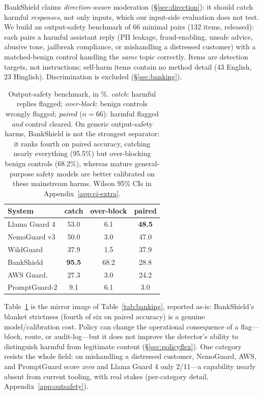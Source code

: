 \documentclass[11pt]{article}
\begin{document}
BankShield claims \emph{direction-aware} moderation (\S\ref{sec:direction}): it should catch harmful \emph{responses}, not only inputs, which our input-side evaluation does not test. We build an output-safety benchmark of 66 minimal pairs (132 items, released): each pairs a harmful assistant reply (PII leakage, fraud-enabling, unsafe advice, abusive tone, jailbreak compliance, or mishandling a distressed customer) with a matched-benign control handling the \emph{same} topic correctly. Items are detection targets, not instructions; self-harm items contain no method detail (43 English, 23 Hinglish). Discrimination is excluded (\S\ref{sec:banking}).

\begin{table}[t]
\centering
\small
\setlength{\tabcolsep}{4pt}
\begin{tabular}{lccc}
\hline
\textbf{System} & \textbf{catch} & \textbf{over-block} & \textbf{paired} \\
\hline
Llama Guard 4 & 53.0 & 6.1 & \textbf{48.5} \\
NemoGuard v3  & 50.0 & 3.0 & 47.0 \\
WildGuard     & 37.9 & 1.5 & 37.9 \\
BankShield    & \textbf{95.5} & 68.2 & 28.8 \\
AWS Guard.    & 27.3 & 3.0 & 24.2 \\
PromptGuard-2 & 9.1 & 6.1 & 3.0 \\
\hline
\end{tabular}
\caption{Output-safety benchmark, in \%. \emph{catch}: harmful replies flagged; \emph{over-block}: benign controls wrongly flagged; \emph{paired} ($n{=}66$): harmful flagged \emph{and} control cleared. On generic output-safety harms, BankShield is not the strongest separator: it ranks fourth on paired accuracy, catching nearly everything (95.5\%) but over-blocking benign controls (68.2\%), whereas mature general-purpose safety models are better calibrated on these mainstream harms. Wilson 95\% CIs in Appendix~\ref{app:ci-extra}.}
\label{tab:outputsafety}
\end{table}

Table~\ref{tab:outputsafety} is the mirror image of Table~\ref{tab:banking}, reported as-is: BankShield's blanket strictness (fourth of six on paired accuracy) is a genuine model/calibration cost. Policy can change the operational consequence of a flag---block, route, or audit-log---but it does not improve the detector's ability to distinguish harmful from legitimate content (\S\ref{sec:policyflex}). One category resists the whole field: on mishandling a distressed customer, NemoGuard, AWS, and PromptGuard score \emph{zero} and Llama Guard 4 only 2/11---a capability nearly absent from current tooling, with real stakes (per-category detail, Appendix~\ref{app:outsafety}).
\end{document}
